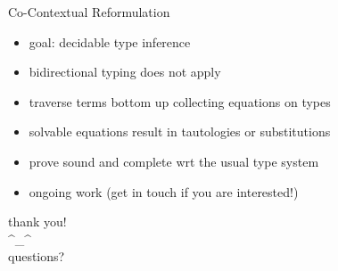 \documentclass[dvipsnames]{beamer}
\newcommand{\sitem}{\item[\raisebox{.45ex}{\rule{.6ex}{.6ex}}]}
\begin{document}
  \begin{frame}{Co-Contextual Reformulation}
    \begin{itemize}
      \sitem goal: decidable type inference
      \sitem bidirectional typing does not apply
      \sitem traverse terms bottom up collecting equations on types
      \sitem solvable equations result in tautologies or substitutions
      \sitem prove sound and complete wrt the usual type system
      \sitem ongoing work (get in touch if you are interested!)
    \end{itemize}
  \end{frame}

  \begin{frame}
    \centering
    \Huge{thank you!} \\
    \Huge{\textasciicircum{}\_\textasciicircum{}} \\
    \Huge{questions?}
  \end{frame}
\end{document}
